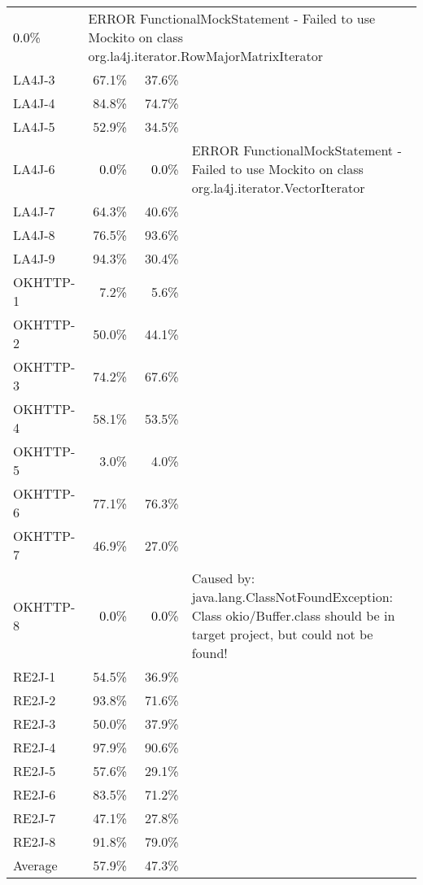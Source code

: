 \begin{tabular}{ l rrrrrrr rrrrrrrr}
                                                           \cellcolor{light-gray}
                                                           \textcolor{black}{0.0}\%
                                                           & \multicolumn{13}{l}{ERROR FunctionalMockStatement - Failed to use Mockito on class org.la4j.iterator.RowMajorMatrixIterator}\\ 
LA4J-3 & 67.1\% & 37.6\%\\ 
LA4J-4 & 84.8\% & 74.7\%\\ 
LA4J-5 & 52.9\% & 34.5\%\\ 
LA4J-6 & \cellcolor{light-gray} \textcolor{black}{0.0}\% &
                                                           \cellcolor{light-gray}
                                                           \textcolor{black}{0.0}\%
 & \multicolumn{13}{l}{ERROR FunctionalMockStatement - Failed to use Mockito on class org.la4j.iterator.VectorIterator}\\ 
LA4J-7 & 64.3\% & 40.6\%\\ 
LA4J-8 & 76.5\% & 93.6\%\\ 
LA4J-9 & 94.3\% & 30.4\%\\ 
OKHTTP-1 & 7.2\% & 5.6\%\\ 
OKHTTP-2 & 50.0\% & 44.1\%\\ 
OKHTTP-3 & 74.2\% & 67.6\%\\ 
OKHTTP-4 & 58.1\% & 53.5\%\\ 
OKHTTP-5 & 3.0\% & 4.0\%\\ 
OKHTTP-6 & 77.1\% & 76.3\%\\ 
OKHTTP-7 & 46.9\% & 27.0\%\\ 
OKHTTP-8 & \cellcolor{light-gray} \textcolor{black}{0.0}\% &
                                                             \cellcolor{light-gray}
                                                             \textcolor{black}{0.0}\%
 & \multicolumn{13}{l}{Caused by: java.lang.ClassNotFoundException:
   Class okio/Buffer.class should be in target project, but could not be found!}\\ 
RE2J-1 & 54.5\% & 36.9\%\\ 
RE2J-2 & 93.8\% & 71.6\%\\ 
RE2J-3 & 50.0\% & 37.9\%\\ 
RE2J-4 & 97.9\% & 90.6\%\\ 
RE2J-5 & 57.6\% & 29.1\%\\ 
RE2J-6 & 83.5\% & 71.2\%\\ 
RE2J-7 & 47.1\% & 27.8\%\\ 
RE2J-8 & 91.8\% & 79.0\%\\ 
\midrule 
Average  &  57.9\% &  47.3\%\\ 
\bottomrule 
\end{tabular} 
